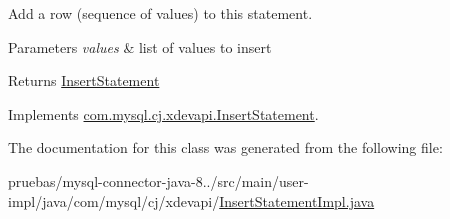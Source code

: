 Add a row (sequence of values) to this statement.


\begin{DoxyParams}{Parameters}
{\em values} & list of values to insert \\
\hline
\end{DoxyParams}
\begin{DoxyReturn}{Returns}
\mbox{\hyperlink{interfacecom_1_1mysql_1_1cj_1_1xdevapi_1_1_insert_statement}{Insert\+Statement}} 
\end{DoxyReturn}


Implements \mbox{\hyperlink{interfacecom_1_1mysql_1_1cj_1_1xdevapi_1_1_insert_statement_a9e215690da535d030277c17766cdbfbe}{com.\+mysql.\+cj.\+xdevapi.\+Insert\+Statement}}.



The documentation for this class was generated from the following file\+:\begin{DoxyCompactItemize}
\item 
pruebas/mysql-\/connector-\/java-\/8../src/main/user-\/impl/java/com/mysql/cj/xdevapi/\mbox{\hyperlink{_insert_statement_impl_8java}{Insert\+Statement\+Impl.\+java}}\end{DoxyCompactItemize}
